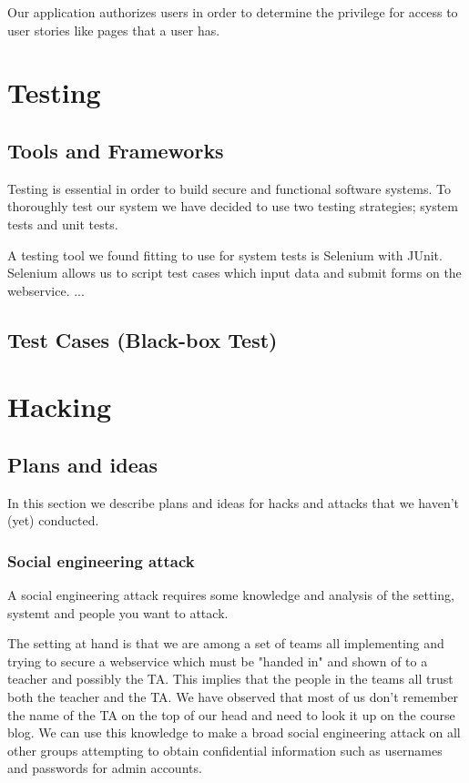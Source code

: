 \documentclass[a4paper]{article}
\begin{document}
Our application authorizes users in order to determine the privilege for access to user stories like pages that a user has.

\section{Testing}
\subsection{Tools and Frameworks}
Testing is essential in order to build secure and functional software systems. To thoroughly test our system we have decided to use two testing strategies; system tests and unit tests.

A testing tool we found fitting to use for system tests is Selenium with JUnit. Selenium allows us to script test cases which input data and submit forms on the webservice.
...

\subsection{Test Cases (Black-box Test)}


\section{Hacking}
\subsection{Plans and ideas}
In this section we describe plans and ideas for hacks and attacks that we haven't (yet) conducted.
\subsubsection{Social engineering attack}
A social engineering attack requires some knowledge and analysis of the setting, systemt and people you want to attack.

The setting at hand is that we are among a set of teams all implementing and trying to secure a webservice which must be "handed in" and shown of to a teacher and possibly the TA. This implies that the people in the teams all trust both the teacher and the TA. We have observed that most of us don't remember the name of the TA on the top of our head and need to look it up on the course blog.
We can use this knowledge to make a broad social engineering attack on all other groups attempting to obtain confidential information such as usernames and passwords for admin accounts.
\end{document}
